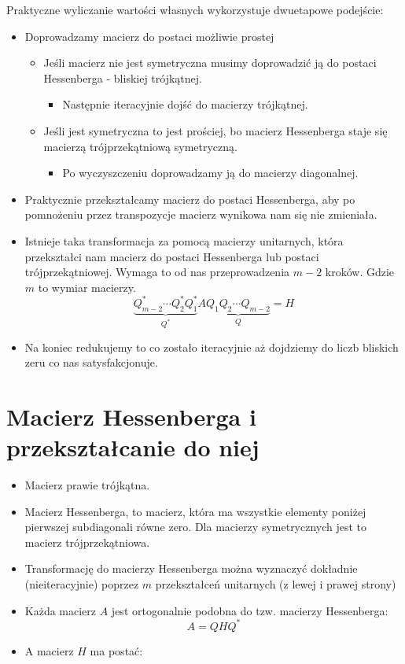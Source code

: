 \documentclass[a4paper]{article}
\begin{document}
Praktyczne wyliczanie wartości własnych wykorzystuje dwuetapowe podejście:
\begin{itemize}
    \item Doprowadzamy macierz do postaci możliwie prostej
    \begin{itemize}
        \item Jeśli macierz nie jest symetryczna musimy doprowadzić ją do postaci Hessenberga - bliskiej trójkątnej.
        \begin{itemize}
            \item Następnie iteracyjnie dojść do macierzy trójkątnej.
        \end{itemize}
        \item Jeśli jest symetryczna to jest prościej, bo macierz Hessenberga staje się macierzą trójprzekątniową symetryczną.
        \begin{itemize}
            \item Po wyczyszczeniu doprowadzamy ją do macierzy diagonalnej.
        \end{itemize}
    \end{itemize}
    \item Praktycznie przekształcamy macierz do postaci Hessenberga, aby po pomnożeniu przez transpozycje macierz wynikowa nam się nie zmieniała.
    \item Istnieje taka transformacja za pomocą macierzy unitarnych, która przekształci nam macierz do postaci Hessenberga lub postaci trójprzekątniowej. Wymaga to od nas przeprowadzenia $m-2$ kroków. Gdzie $m$ to wymiar macierzy.
    \begin{equation*}
        \underbrace{Q^*_{m-2} \cdots Q_2^* Q_1^*}_{Q^*} A \underbrace{Q_1Q_2 \cdots Q_{m-2}}_{Q} = H
    \end{equation*}
    \item Na koniec redukujemy to co zostało iteracyjnie aż dojdziemy do liczb bliskich zeru co nas satysfakcjonuje.
\end{itemize}

\section{Macierz Hessenberga i przekształcanie do niej}
\begin{itemize}
    \item Macierz prawie trójkątna.
    \item Macierz Hessenberga, to macierz, która ma wszystkie elementy poniżej pierwszej subdiagonali równe zero. Dla macierzy symetrycznych jest to macierz trójprzekątniowa.
    \item Transformację do macierzy Hessenberga można wyznaczyć dokładnie (nieiteracyjnie) poprzez $m$ przekształceń unitarnych (z lewej i prawej strony)
    \item Każda macierz $A$ jest ortogonalnie podobna do tzw. macierzy Hessenberga:
    \begin{equation*}
        A = QHQ^*
    \end{equation*}
    \item A macierz $H$ ma postać:
\end{itemize}
\end{document}
